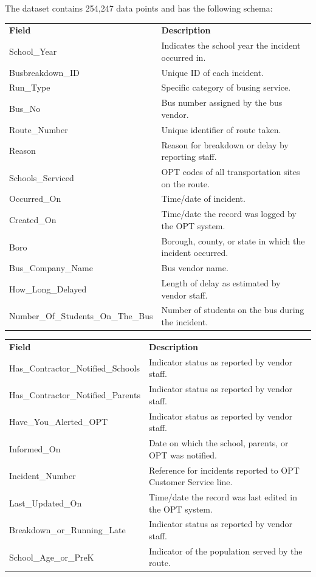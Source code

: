 \documentclass[11pt]{article}
\begin{document}
The dataset contains 254,247 data points and has the following schema:
\begin{table}
\begin{tabular}{ll}
\bf{Field} & \bf{Description} \\
School\_Year & Indicates the school year the incident occurred in. \\
Busbreakdown\_ID & Unique ID of each incident. \\
Run\_Type & Specific category of busing service. \\
Bus\_No & Bus number assigned by the bus vendor. \\
Route\_Number & Unique identifier of route taken. \\
Reason & Reason for breakdown or delay by reporting staff. \\
Schools\_Serviced & OPT codes of all transportation sites on the route. \\
Occurred\_On & Time/date of incident. \\
Created\_On & Time/date the record was logged by the OPT system. \\
Boro & Borough, county, or state in which the incident occurred. \\
Bus\_Company\_Name & Bus vendor name. \\
How\_Long\_Delayed & Length of delay as estimated by vendor staff. \\
Number\_Of\_Students\_On\_The\_Bus & Number of students on the bus during the incident. \\
\end{tabular}
\end{table}
\begin{table}
\begin{tabular}{ll}
\bf{Field} & \bf{Description} \\
Has\_Contractor\_Notified\_Schools & Indicator status as reported by vendor staff. \\
Has\_Contractor\_Notified\_Parents & Indicator status as reported by vendor staff. \\
Have\_You\_Alerted\_OPT & Indicator status as reported by vendor staff. \\
Informed\_On & Date on which the school, parents, or OPT was notified. \\
Incident\_Number & Reference for incidents reported to OPT Customer Service line. \\
Last\_Updated\_On & Time/date the record was last edited in the OPT system. \\
Breakdown\_or\_Running\_Late & Indicator status as reported by vendor staff. \\
School\_Age\_or\_PreK & Indicator of the population served by the route. \\
\end{tabular}
\end{table}
\end{document}
